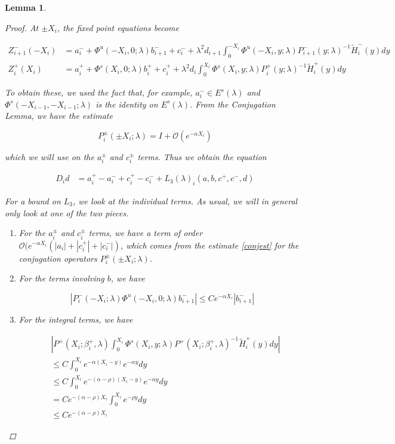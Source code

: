 \documentclass[12pt]{article}
\newtheorem{lemma}{Lemma}
\begin{document}
\begin{lemma}
\begin{proof}

At $\pm X_i$, the fixed point equations become

\begin{align*}
Z_{i+1}^-(-X_i) &= a_i^- + \Phi^u(-X_i, 0; \lambda) b_{i+1}^- + c_i^- 
+ \lambda^2 d_{i+1} \int_0^{-X_i} \Phi^u(-X_i, y; \lambda) P_{i+1}^-(y; \lambda)^{-1} \tilde{H}_i^-(y) dy \\
Z_i^+(X_i) &= a_i^+ + \Phi^s(X_i, 0; \lambda) b_i^+ + c_i^+ 
+ \lambda^2 d_i \int_0^{X_i} \Phi^s(X_i, y; \lambda) P_i^+(y; \lambda)^{-1} \tilde{H}_i^+(y) dy
\end{align*}

To obtain these, we used the fact that, for example, $a_i^- \in E^s(\lambda)$ and $\Phi^s(-X_{i-1}, -X_{i-1}; \lambda)$ is the identity on $E^s(\lambda)$. From the Conjugation Lemma, we have the estimate

\begin{equation}\label{conjest}
P_i^\pm(\pm X_i; \lambda) = I + \mathcal{O}(e^{-\alpha X_i})
\end{equation}

which we will use on the $a_i^\pm$ and $c_i^\pm$ terms. Thus we obtain the equation

\begin{align}\label{Dideq1}
D_i d &= a_i^+ - a_i^- + c_i^+ - c_i^- + L_3(\lambda)_i(a, b, c^+, c^-, d)
\end{align}

For a bound on $L_3$, we look at the individual terms. As usual, we will in general only look at one of the two pieces.

\begin{enumerate}

\item For the $a_i^\pm$ and $c_i^\pm$ terms, we have a term of order $\mathcal{O}(e^{-\alpha X_i}(|a_i| + |c_i^+| + |c_i^-|)$, which comes from the estimate \eqref{conjest} for the conjugation operators $P_i^\pm(\pm X_i; \lambda)$.

\item For the terms involving $b$, we have

\[
| P_i^-(-X_i; \lambda) \Phi^u(-X_i, 0; \lambda) b_{i+1}^-| \leq C e^{-\alpha X_i} |b_{i+1}
^-|
\]

\item For the integral terms, we have

\begin{align*}
&\left|
P^+(X_i; \beta_i^+, \lambda) \int_0^{X_i} \Phi^s(X_i, y; \lambda) P^+(X_i; \beta_i^+, \lambda)^{-1} \tilde{H}_i^+(y) dy \right| \\
&\leq C \int_0^{X_i} e^{-\alpha(X_i - y)}e^{-\alpha y} dy \\
&\leq C \int_0^{X_i} e^{-(\alpha - \rho)(X_i - y)}e^{-\alpha y} dy \\
&= C e^{-(\alpha - \rho) X_i} \int_0^{X_i} e^{-\rho y} dy \\ 
&\leq C e^{-(\alpha - \rho) X_i} 
\end{align*}


\end{enumerate}
\end{proof}
\end{lemma}
\end{document}
